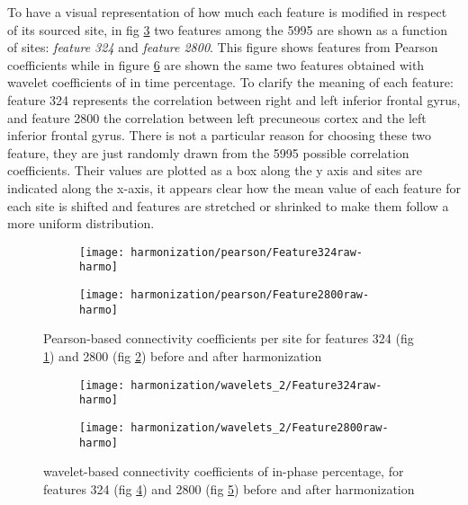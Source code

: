 \documentclass[11pt]{report}
\begin{document}
To have a visual representation of how much each feature is modified in respect of its sourced site, in fig \ref{fig:features_raw-harmo} two features among the 5995 are shown as a function of sites: \emph{feature 324} and \emph{feature 2800}. This figure shows features from Pearson coefficients while in figure \ref{fig:wavelet_features_raw-harmo} are shown the same two features obtained with wavelet coefficients of in time percentage.
To clarify the meaning of each feature: feature 324 represents the correlation between right and left inferior frontal gyrus, and feature 2800 the correlation between left precuneous cortex and the left inferior frontal gyrus. 
There is not a particular reason for choosing these two feature, they are just randomly drawn from the 5995 possible correlation coefficients.
Their values are plotted as a box along the y axis and sites are indicated along the x-axis, it appears clear how the mean value of each feature for each site is shifted and features are stretched or shrinked to make them follow a more uniform distribution.

\begin{figure}
\centering
\begin{subfigure}[b]{1.\textwidth}
   \texttt{[image: harmonization/pearson/Feature324raw-harmo]}
   \caption{}
   \label{fig:feature324}
\end{subfigure}
\begin{subfigure}[b]{1.\textwidth}
   \texttt{[image: harmonization/pearson/Feature2800raw-harmo]}
   \caption{}
   \label{fig:feature2800}
\end{subfigure}
\caption{Pearson-based connectivity coefficients per site for features 324 (fig \ref{fig:feature324}) and 2800 (fig \ref{fig:feature2800}) before and after harmonization}
\label{fig:features_raw-harmo}
\end{figure}



 \begin{figure}
 \centering
 \begin{subfigure}[b]{1.\textwidth}
    \texttt{[image: harmonization/wavelets\_2/Feature324raw-harmo]}
    \caption{}
    \label{fig:wavelet_feature324}
 \end{subfigure}
 \begin{subfigure}[b]{1.\textwidth}
    \texttt{[image: harmonization/wavelets\_2/Feature2800raw-harmo]}
    \caption{}
    \label{fig:wavelet_feature2800}
 \end{subfigure}
 \caption{wavelet-based connectivity coefficients of in-phase percentage, for features 324 (fig \ref{fig:wavelet_feature324}) and 2800 (fig \ref{fig:wavelet_feature2800}) before and after harmonization}
 \label{fig:wavelet_features_raw-harmo}
 \end{figure}
\end{document}
